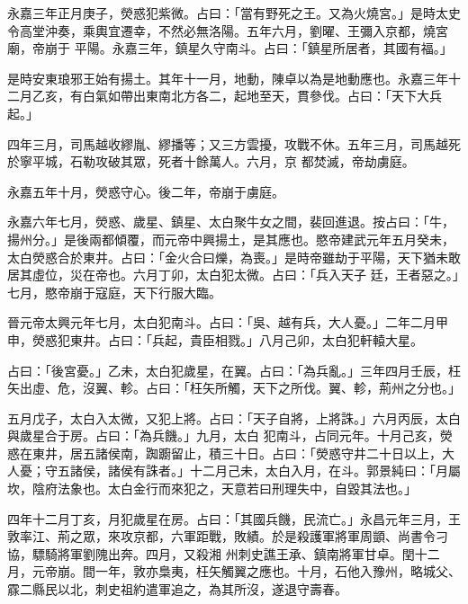 \begin{pinyinscope}
 永嘉三年正月庚子，熒惑犯紫微。占曰：「當有野死之王。又為火燒宮。」是時太史令高堂沖奏，乘輿宜遷幸，不然必無洛陽。五年六月，劉曜、王彌入京都，燒宮廟，帝崩于
 平陽。永嘉三年，鎮星久守南斗。占曰：「鎮星所居者，其國有福。」



 是時安東琅邪王始有揚土。其年十一月，地動，陳卓以為是地動應也。永嘉三年十二月乙亥，有白氣如帶出東南北方各二，起地至天，貫參伐。占曰：「天下大兵起。」



 四年三月，司馬越收繆胤、繆播等；又三方雲擾，攻戰不休。五年三月，司馬越死於寧平城，石勒攻破其眾，死者十餘萬人。六月，京
 都焚滅，帝劫虜庭。



 永嘉五年十月，熒惑守心。後二年，帝崩于虜庭。



 永嘉六年七月，熒惑、歲星、鎮星、太白聚牛女之間，裴回進退。按占曰：「牛，揚州分。」是後兩都傾覆，而元帝中興揚土，是其應也。愍帝建武元年五月癸未，太白熒惑合於東井。占曰：「金火合曰爍，為喪。」是時帝雖劫于平陽，天下猶未敢居其虛位，災在帝也。六月丁卯，太白犯太微。占曰：「兵入天子
 廷，王者惡之。」七月，愍帝崩于寇庭，天下行服大臨。



 晉元帝太興元年七月，太白犯南斗。占曰：「吳、越有兵，大人憂。」二年二月甲申，熒惑犯東井。占曰：「兵起，貴臣相戮。」八月己卯，太白犯軒轅大星。



 占曰：「後宮憂。」乙未，太白犯歲星，在翼。占曰：「為兵亂。」三年四月壬辰，枉矢出虛、危，沒翼、軫。占曰：「枉矢所觸，天下之所伐。翼、軫，荊州之分也。」



 五月戊子，太白入太微，又犯上將。占曰：「天子自將，上將誅。」六月丙辰，太白與歲星合于房。占曰：「為兵饑。」九月，太白
 犯南斗，占同元年。十月己亥，熒惑在東井，居五諸侯南，踟躕留止，積三十日。占曰：「熒惑守井二十日以上，大人憂；守五諸侯，諸侯有誅者。」十二月己未，太白入月，在斗。郭景純曰：「月屬坎，陰府法象也。太白金行而來犯之，天意若曰刑理失中，自毀其法也。」



 四年十二月丁亥，月犯歲星在房。占曰：「其國兵饑，民流亡。」永昌元年三月，王敦率江、荊之眾，來攻京都，六軍距戰，敗績。於是殺護軍將軍周顗、尚書令刁協，驃騎將軍劉隗出奔。四月，又殺湘
 州刺史譙王承、鎮南將軍甘卓。閏十二月，元帝崩。間一年，敦亦梟夷，枉矢觸翼之應也。十月，石他入豫州，略城父、霡二縣民以北，刺史祖約遣軍追之，為其所沒，遂退守壽春。




\end{pinyinscope}
